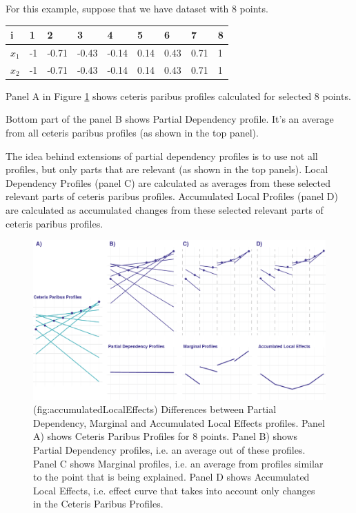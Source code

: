 \documentclass[12pt,]{krantz}
\begin{document}
For this example, suppose that we have dataset with 8 points.

\begin{longtable}[]{@{}lllllllll@{}}
\toprule
i & 1 & 2 & 3 & 4 & 5 & 6 & 7 & 8\tabularnewline
\midrule
\endhead
\(x_1\) & -1 & -0.71 & -0.43 & -0.14 & 0.14 & 0.43 & 0.71 & 1\tabularnewline
\(x_2\) & -1 & -0.71 & -0.43 & -0.14 & 0.14 & 0.43 & 0.71 & 1\tabularnewline
\bottomrule
\end{longtable}

Panel A in Figure \ref{fig:accumulatedLocalEffects} shows ceteris paribus profiles calculated for selected 8 points.

Bottom part of the panel B shows Partial Dependency profile. It's an average from all ceteris paribus profiles (as shown in the top panel).

The idea behind extensions of partial dependency profiles is to use not all profiles, but only parts that are relevant (as shown in the top panels).
Local Dependency Profiles (panel C) are calculated as averages from these selected relevant parts of ceteris paribus profiles.
Accumulated Local Profiles (panel D) are calculated as accumulated changes from these selected relevant parts of ceteris paribus profiles.

\begin{figure}

{\centering \includegraphics[width=0.9\linewidth]{figure/CP_ALL} 

}

\caption{(fig:accumulatedLocalEffects) Differences between Partial Dependency, Marginal and Accumulated Local Effects profiles. Panel A) shows Ceteris Paribus Profiles for 8 points. Panel B) shows Partial Dependency profiles, i.e. an average out of these profiles. Panel C shows Marginal profiles, i.e. an average from profiles similar to the point that is being explained. Panel D shows Accumulated Local Effects, i.e. effect curve that takes into account only changes in the Ceteris Paribus Profiles.}\label{fig:accumulatedLocalEffects}
\end{figure}
\end{document}
